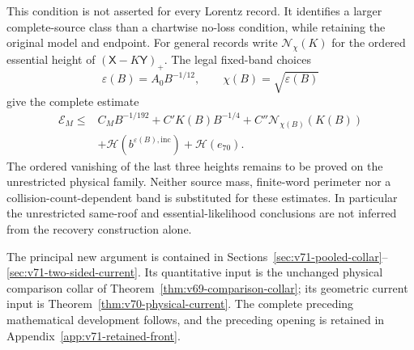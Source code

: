 This condition is not asserted for every Lorentz record. It identifies
a larger complete-source class than a chartwise no-loss condition,
while retaining the original model and endpoint. For general records
write $\mathcal N_\chi(K)$ for the ordered essential height of
$(\mathsf X-K\mathsf Y)_+$. The legal fixed-band choices
\[
 \varepsilon(B)=A_0B^{-1/12},\qquad
                   \chi(B)=\sqrt{\varepsilon(B)}
\]
give the complete estimate
\begin{equation}\label{eq:intro-v71-budget}
 \begin{split}
 \mathcal E_M\le{}&C_MB^{-1/192}+C'K(B)B^{-1/4}
                    +C''\mathcal N_{\chi(B)}(K(B))\\
                 &+\mathcal H(b^{\varepsilon(B),\mathrm{inc}})
                    +\mathcal H(e_{70}).
 \end{split}
\end{equation}
The ordered vanishing of the last three heights remains to be proved
on the unrestricted physical family. Neither source mass, finite-word
perimeter nor a collision-count-dependent band is substituted for
these estimates. In particular the unrestricted same-roof and
essential-likelihood conclusions are not inferred from the recovery
construction alone.

The principal new argument is contained in
Sections~\ref{sec:v71-pooled-collar}--\ref{sec:v71-two-sided-current}.
Its quantitative input is the unchanged physical comparison collar
of Theorem~\ref{thm:v69-comparison-collar}; its geometric current
input is Theorem~\ref{thm:v70-physical-current}. The complete
preceding mathematical development follows, and the preceding opening
is retained in Appendix~\ref{app:v71-retained-front}.

